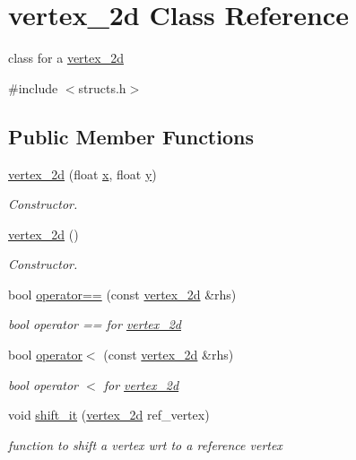\hypertarget{classvertex__2d}{}\section{vertex\+\_\+2d Class Reference}
\label{classvertex__2d}


class for a \hyperlink{classvertex__2d}{vertex\+\_\+2d}  




{\ttfamily \#include $<$structs.\+h$>$}

\subsection*{Public Member Functions}
\begin{DoxyCompactItemize}
\item 
\hyperlink{classvertex__2d_a03bffd458f04065c2d51e4f4272b3b25}{vertex\+\_\+2d} (float \hyperlink{classvertex__2d_a73ad38186170ef31f5fca79eac4d3770}{x}, float \hyperlink{classvertex__2d_a11843935c1197d25dba231bbc767a97a}{y})
\begin{DoxyCompactList}\small\item\em Constructor. \end{DoxyCompactList}\item 
\hyperlink{classvertex__2d_a8e3ed77b4a5e59a57aead0fef79a3fb0}{vertex\+\_\+2d} ()
\begin{DoxyCompactList}\small\item\em Constructor. \end{DoxyCompactList}\item 
bool \hyperlink{classvertex__2d_a5003e0efb7b170c0c0577efa93352ba0}{operator==} (const \hyperlink{classvertex__2d}{vertex\+\_\+2d} \&rhs)
\begin{DoxyCompactList}\small\item\em bool operator == for \hyperlink{classvertex__2d}{vertex\+\_\+2d} \end{DoxyCompactList}\item 
bool \hyperlink{classvertex__2d_a76fd20de06b76243194e5bd09a6494ad}{operator$<$} (const \hyperlink{classvertex__2d}{vertex\+\_\+2d} \&rhs)
\begin{DoxyCompactList}\small\item\em bool operator $<$ for \hyperlink{classvertex__2d}{vertex\+\_\+2d} \end{DoxyCompactList}\item 
void \hyperlink{classvertex__2d_ac2ea8109fd2ae08d693e9b654c90cb29}{shift\+\_\+it} (\hyperlink{classvertex__2d}{vertex\+\_\+2d} ref\+\_\+vertex)
\begin{DoxyCompactList}\small\item\em function to shift a vertex wrt to a reference vertex \end{DoxyCompactList}\end{DoxyCompactItemize}
